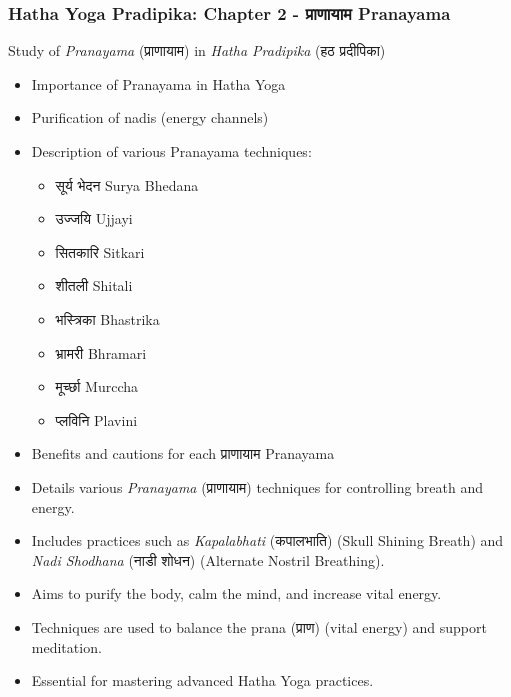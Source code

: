 \begin{frame}[fragile]\frametitle{Hatha Yoga Pradipika: Chapter 2 - प्राणायाम  Pranayama}
Study of \textit{Pranayama} (प्राणायाम) in \textit{Hatha Pradipika} (हठ प्रदीपिका)

\begin{itemize}
    \item Importance of Pranayama in Hatha Yoga
    \item Purification of nadis (energy channels)
    \item Description of various Pranayama techniques:
    \begin{itemize}
        \item सूर्य भेदन Surya Bhedana
        \item उज्जयि Ujjayi
        \item सितकारि Sitkari
        \item शीतली Shitali
        \item भस्त्रिका Bhastrika
        \item भ्रामरी Bhramari
        \item मूर्च्छा Murccha
        \item प्लविनि Plavini
    \end{itemize}
    \item Benefits and cautions for each प्राणायाम Pranayama
	\item Details various \textit{Pranayama} (प्राणायाम) techniques for controlling breath and energy.
	\item Includes practices such as \textit{Kapalabhati} (कपालभाति) (Skull Shining Breath) and \textit{Nadi Shodhana} (नाडी शोधन) (Alternate Nostril Breathing).
	\item Aims to purify the body, calm the mind, and increase vital energy.
	\item Techniques are used to balance the prana (प्राण) (vital energy) and support meditation.
	\item Essential for mastering advanced Hatha Yoga practices.
  \end{itemize}

\end{frame}


